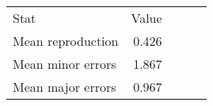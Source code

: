 \begin{tabular}{lrrrr}
\hline\hline
Stat & Value \\
Mean reproduction & 0.426 \\
Mean minor errors & 1.867 \\
Mean major errors & 0.967 \\
\hline\hline
\end{tabular}
